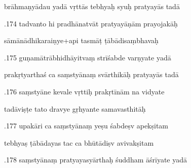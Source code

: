 \documentclass[article,12pt,a4paper]{memoir}%
\newcounter{parCount}
\begin{document}
	  
	  \pstart \leavevmode%
	brāhmaṇyādau yadā vṛttās tebhyaḥ syuḥ pratyayās tadā 
	{}
	\pend%
      

	  
	  \pstart {}.174 tadvanto hi pradhānatvāt pratyayāṇām prayojakāḥ 
	{}
	\pend%
      

	  
	  \pstart \leavevmode%
	sāmānādhikaraiṇye+api tasmāṭ ṭābādisaṃbhavaḥ 
	{}
	\pend%
      

	  
	  \pstart {}.175 guṇamātrābhidhāyitvaṃ strīśabde varṇyate yadā 
	{}
	\pend%
      

	  
	  \pstart \leavevmode%
	prakṛtyarthaś ca saṃstyānaṃ svārthikāḥ pratyayās tadā 
	{}
	\pend%
      

	  
	  \pstart {}.176 saṃstyāne kevale vṛttiḥ prakṛtīnām na vidyate 
	{}
	\pend%
      

	  
	  \pstart \leavevmode%
	tadāviṣṭe tato dravye gṛhyante samavasthitāḥ 
	{}
	\pend%
      

	  
	  \pstart {}.177 upakāri ca saṃstyānaṃ yeṣu śabdeṣv apekṣitam 
	{}
	\pend%
      

	  
	  \pstart \leavevmode%
	tebhyaṣ ṭābādayas tac ca bhūtādiṣv avivakṣitam 
	{}
	\pend%
      

	  
	  \pstart {}.178 saṃstyānaṃ pratyayasyārthaḥ śuddham āśrīyate yadā 
	{}
	\pend%
      
\end{document}
